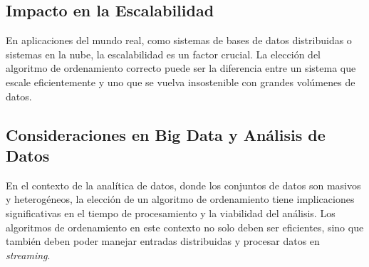 \subsection{Impacto en la Escalabilidad}
En aplicaciones del mundo real, como sistemas de bases de datos distribuidas o sistemas en la nube, la escalabilidad es un factor crucial. La elección del algoritmo de ordenamiento correcto puede ser la diferencia entre un sistema que escale eficientemente y uno que se vuelva insostenible con grandes volúmenes de datos.

\subsection{Consideraciones en Big Data y Análisis de Datos}
En el contexto de la analítica de datos, donde los conjuntos de datos son masivos y heterogéneos, la elección de un algoritmo de ordenamiento tiene implicaciones significativas en el tiempo de procesamiento y la viabilidad del análisis. Los algoritmos de ordenamiento en este contexto no solo deben ser eficientes, sino que también deben poder manejar entradas distribuidas y procesar datos en \textit{streaming}.

